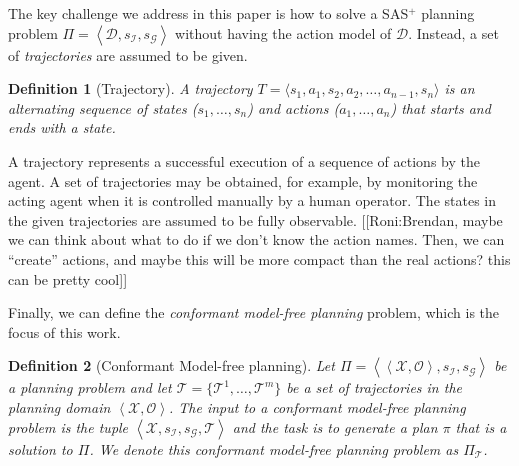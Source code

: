\documentclass[letterpaper]{article}
\newtheorem{definition}{Definition}
\newcommand{\tuple}[1]{\ensuremath{\left \langle #1 \right \rangle }}
\newcommand{\SAS}{SAS$^+$}
\newcommand{\roni}[1]{[[Roni:#1]]}
\begin{document}
The key challenge we address in this paper is how to solve a \SAS{} 
planning problem $\Pi=\tuple{\mathcal{D},s_\mathcal{I}, s_\mathcal{G}}$ without having the action model of $\mathcal{D}$. Instead, a set of {\em trajectories} are assumed to be given. 
\begin{definition}[Trajectory]
A trajectory $T=\langle s_1, a_1, s_2, a_2, \ldots, a_{n-1}, s_n\rangle$ is an alternating sequence of states ($s_1,\ldots,s_n$) and actions ($a_1,\ldots,a_n$) that starts and ends with a state. 
\end{definition}
A trajectory represents a successful execution of a sequence of actions by the agent. A set of trajectories may be obtained, for example, by monitoring the acting agent when it is controlled manually by a human operator. The states in the given trajectories are assumed to be fully observable. 
\roni{Brendan, maybe we can think about what to do if we don't know the action names. Then, we can ``create'' actions, and maybe this will be more compact than the real actions? this can be pretty cool}

Finally, we can define the {\em conformant model-free planning} problem, which is the focus of this work. 

\begin{definition}[Conformant Model-free planning]
	Let $\Pi=\tuple{\tuple{\mathcal{X},\mathcal{O}},s_\mathcal{I}, s_\mathcal{G}}$ be a planning 
	problem and let $\mathcal{T}=\{\mathcal{T}^1,\ldots,\mathcal{T}^m\}$ be a set of trajectories in 
	the planning domain $\tuple{\mathcal{X},\mathcal{O}}$. 
	The input to a conformant model-free planning problem is 
	the tuple $\tuple{\mathcal{X},s_\mathcal{I}, s_\mathcal{G}, \mathcal{T}}$
	and the task is to generate a plan $\pi$  that is a solution to $\Pi$. We denote this conformant model-free planning problem as $\Pi_\mathcal{T}$. 
	\label{def:model-free-planning}
\end{definition}

\end{document}
